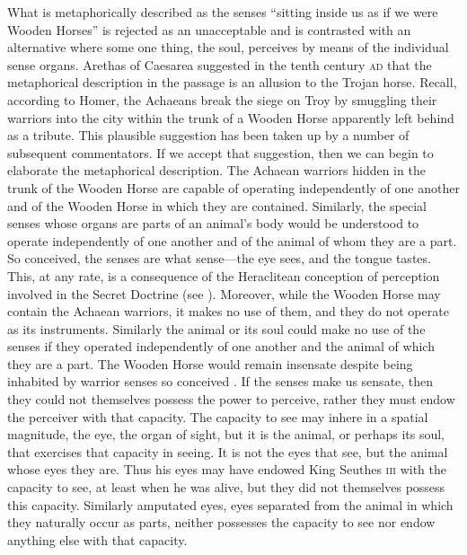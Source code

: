 What is metaphorically described as the senses ``sitting inside us as if we were Wooden Horses'' is rejected as an unacceptable and is contrasted with an alternative where some one thing, the soul, perceives by means of the individual sense organs. Arethas of Caesarea suggested in the tenth century \textsc{ad} that the metaphorical description in the passage is an allusion to the Trojan horse. Recall, according to Homer, the Achaeans break the siege on Troy by smuggling their warriors into the city within the trunk of a Wooden Horse apparently left behind as a tribute. This plausible suggestion has been taken up by a number of subsequent commentators. If we accept that suggestion, then we can begin to elaborate the metaphorical description. The Achaean warriors hidden in the trunk of the Wooden Horse are capable of operating independently of one another and of the Wooden Horse in which they are contained. Similarly, the special senses whose organs are parts of an animal's body would be understood to operate independently of one another and of the animal of whom they are a part. So conceived, the senses are what sense---the eye sees, and the tongue tastes. This, at any rate, is a consequence of the Heraclitean conception of perception involved in the Secret Doctrine (see \citealt[30--31]{Burnyeat:1976ab}). Moreover, while the Wooden Horse may contain the Achaean warriors, it makes no use of them, and they do not operate as its instruments. Similarly the animal or its soul could make no use of the senses if they operated independently of one another and the animal of which they are a part. The Wooden Horse would remain insensate despite being inhabited by warrior senses so conceived \citep[see][30]{Burnyeat:1976ab}. If the senses make us sensate, then they could not themselves possess the power to perceive, rather they must endow the perceiver with that capacity. The capacity to see may inhere in a spatial magnitude, the eye, the organ of sight, but it is the animal, or perhaps its soul, that exercises that capacity in seeing. It is not the eyes that see, but the animal whose eyes they are. Thus his eyes may have endowed King Seuthes \textsc{iii} with the capacity to see, at least when he was alive, but they did not themselves possess this capacity. Similarly amputated eyes, eyes separated from the animal in which they naturally occur as parts, neither possesses the capacity to see nor endow anything else with that capacity. 

